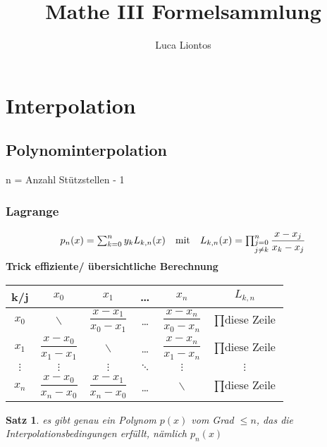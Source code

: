 \documentclass[
	ngerman,
	accentcolor=9c,%
	type=intern,
	marginpar=false
	]{tudapub}
\begin{document}
\newtheorem{satz}{Satz}[section]
\newtheorem{korolar}[satz]{Korolar}
\newtheorem{definition}[satz]{Definition}





\title{Mathe III Formelsammlung}
\author{Luca Liontos}

\maketitle

\tableofcontents
\newpage

\section{Interpolation}
    \subsection{Polynominterpolation}
        n = Anzahl Stützstellen - 1
        \subsubsection{Lagrange}
            \begin{equation*}
                 \begin{array}{l c r}
                             p_n(x) = \sum_{k=0}^n y_k L_{k,n}(x) & \text{mit} & L_{k,n} (x) = \prod_{\substack{j=0 \\ j\not=k}}^n \dfrac{x-x_j}{x_k-x_j}
                \end{array}
            \end{equation*}
            \textbf{Trick effiziente/ übersichtliche Berechnung}\\
            \begin{center}
                \begin{tabular}{c || c | c | c | c | c |}
                    k/j & $x_0$ & $x_1$ & \dots & $x_n$ & $L_{k,n}$\\
                    \hline
                    \hline
                    $x_0$ & $\backslash$ & $\dfrac{x-x_1}{x_0-x_1}$ & \dots & $\dfrac{x-x_n}{x_0-x_n}$ & $\prod\text{diese Zeile}$\\
                    $x_1$ & $\dfrac{x-x_0}{x_1-x_1}$ & $\backslash$ & \dots & $\dfrac{x-x_n}{x_1-x_n}$ & $\prod\text{diese Zeile}$\\
                    $\vdots$ & $\vdots$ & $\vdots$ & $\ddots$ & $\vdots$ & $\vdots$\\ 
                    $x_n$ & $\dfrac{x-x_0}{x_n-x_0}$ & $\dfrac{x-x_1}{x_n-x_0}$ & \dots & $\backslash$ & $\prod\text{diese Zeile}$
                \end{tabular}
            \end{center}
        \begin{satz}
                es gibt genau ein Polynom $p(x)$ vom Grad $\leq n$, das die Interpolationsbedingungen erfüllt, nämlich $p_n(x)$
        \end{satz}
\end{document}
